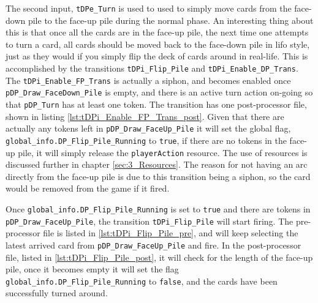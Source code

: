 \documentclass[runningheads,a4paper]{llncs}
\newcommand{\GPenSIM}{../GPenSIM}
\begin{document}
The second input, \verb!tDPe_Turn! is used to used to simply move cards from the face-down pile to the face-up pile during the normal phase. An interesting thing about this is that once all the cards are in the face-up pile, the next time one attempts to turn a \ac{card}, all cards should be moved back to the face-down pile in \ac{lifo} style, just as they would if you simply flip the deck of cards around in real-life. 
\newline
This is accomplished by the transitions \verb!tDPi_Flip_Pile! and \verb!tDPi_Enable_DP_Trans!. The \verb!tDPi_Enable_FP_Trans! is actually a siphon, and becomes enabled once \verb!pDP_Draw_FaceDown_Pile! is empty, and there is an active turn action on-going so that \verb!pDP_Turn! has at least one token. The transition has one post-processor file, shown in listing \ref{lst:tDPi_Enable_FP_Trans_post}. Given that there are actually any tokens left in \verb!pDP_Draw_FaceUp_Pile! it will set the global flag, \verb!global_info.DP_Flip_Pile_Running! to \verb!true!, if there are no tokens in the face-up pile, it will simply release the \verb!playerAction! resource. The use of resources is discussed further in chapter \ref{sec:3_Resources}. The reason for not having an arc directly from the face-up pile is due to this transition being a siphon, so the \ac{card} would be removed from the game if it fired.

Once \verb!global_info.DP_Flip_Pile_Running! is set to \verb!true! and there are tokens in \verb!pDP_Draw_FaceUp_Pile!, the transition \verb!tDPi_Flip_Pile! will start firing. The pre-processor file is listed in \ref{lst:tDPi_Flip_Pile_pre}, and will keep selecting the latest arrived \ac{card} from \verb!pDP_Draw_FaceUp_Pile! and fire. In the post-processor file, listed in \ref{lst:tDPi_Flip_Pile_post}, it will check for the length of the face-up pile, once it becomes empty it will set the flag \verb!global_info.DP_Flip_Pile_Running! to \verb!false!, and the cards have been successfully turned around.


\end{document}
